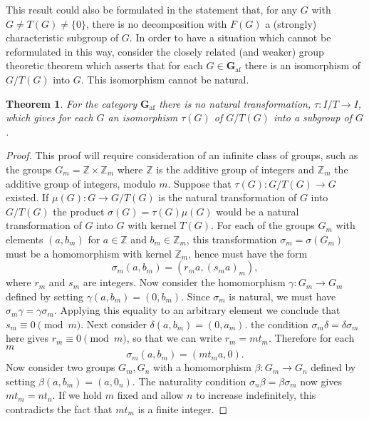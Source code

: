 \documentclass[11pt,a4paper]{report}
\newtheorem{theorem}{Theorem}
\begin{document}
This result could also be formulated in the statement that, for any $G$ with $G\neq T(G)\neq\{0\}$, there is no decomposition
 with $F(G)$ a (strongly) characteristic subgroup of $G$. In order to have a situation which cannot be
reformulated in this way, consider the closely related (and weaker) group theoretic theorem which asserts that for each
$G\in\mathbf{G}_\text{af}$ there is an isomorphism of $G/T(G)$ into $G$. This isomorphism cannot be natural.
\begin{theorem}\label{thm:not-nat}
	For the category $\mathbf{G}_\text{af}$ there is no natural transformation, $\tau:I/T\rightarrow I$, which gives for
	each $G$ an isomorphism $\tau(G)$ of $G/T(G)$ into a subgroup of $G$.
\end{theorem}
\begin{proof}
	This proof will require consideration of an infinite class of groups, such as the groups $G_m=\mathbb{Z}\times
	\mathbb{Z}_m$ where $\mathbb{Z}$ is the additive group of integers and $\mathbb{Z}_m$ the additive group of
	integers, modulo $m$. Suppose that $\tau(G): G/T(G)\rightarrow G$ existed. If $\mu(G):G\rightarrow G/T(G)$ is the
	natural transformation of $G$ into $G/T(G)$ the product $\sigma(G)=\tau(G)\mu(G)$ would be a natural transformation
	of $G$ into $G$ with kernel $T(G)$. For each of the groups $G_m$ with elements $(a,b_m)$ for $a\in \mathbb{Z}$ and 
	$b_m\in \mathbb{Z}_m$, this transformation $\sigma_m=\sigma(G_m)$
	must be a homomorphism with kernel $\mathbb{Z}_m$, hence must have the form
	\begin{equation*}
		\sigma_m(a,b_m)=(r_m a,{(s_m a)}_m),
	\end{equation*}
	where $r_m$ and $s_m$ are integers. Now consider the homomorphism $\gamma:G_m\rightarrow G_m$ defined by setting
	$\gamma(a,b_m)= (0,b_m)$. Since $\sigma_m$ is natural, we must have $\sigma_m\gamma=\gamma\sigma_m$. Applying this
	equality to an arbitrary element we conclude that $s_m\equiv 0 \pmod{m}$. Next consider $\delta(a,b_m)=(0,a_m)$.
	the condition $\sigma_m\delta=\delta\sigma_m$ here gives $r_m\equiv 0\pmod{m}$, so that we can write $r_m=mt_m$.
	Therefore for each $m$
	\begin{equation*}
		\sigma_m(a,b_m)=(mt_m a,0).
	\end{equation*}
	Now consider two groups $G_m,G_n$ with a homomorphism $\beta:G_m\rightarrow G_n$ defined by setting
	$\beta(a,b_m)= (a,0_n)$. The naturality condition $\sigma_n\beta=\beta\sigma_m$ now gives $mt_m=nt_n$.
	If we hold $m$ fixed and allow $n$ to increase indefinitely, this contradicts the fact that $m t_m$ is a finite
	integer.
\end{proof}
\end{document}
